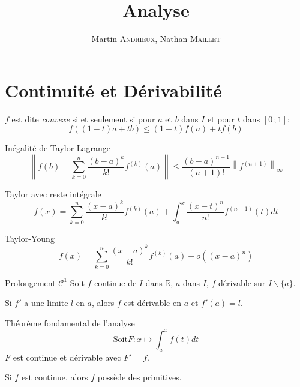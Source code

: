 \documentclass[french, a4paper, 10pt, twocolumn]{article}
\title{Analyse}
\author{Martin \textsc{Andrieux}, Nathan \textsc{Maillet}}
\date{}
\newcommand{\ssi}{si et seulement si\xspace}		%
\newcommand{\R}{\mathbb{R}}   %
\newcommand{\po}{\left(}         %
\newcommand{\pf}{\right)}        %
\newcommand{\pof}[1]{\po #1 \pf} %
\newcommand{\interff}[2]{\left[#1\,;#2\right]}   %
\begin{document}
\maketitle

\section{Continuité et Dérivabilité}
\begin{definition}
  \(f\) est dite \emph{convexe} \ssi pour \(a\) et \(b\) dans \(I\) et pour \(t\) dans \(\interff{0}{1}\):
  \[f((1-t)a+tb)\leqslant (1-t)f(a)+tf(b)\]
\end{definition}

\begin{theoreme}{Inégalité de Taylor-Lagrange}
  \[\left\lVert f(b)-\sum_{k=0}^{n}\dfrac{\pof{b-a}^{k}}{k!}f^{(k)}(a)\right\rVert \leqslant\dfrac{\pof{b-a}^{n+1}}{(n+1)!}\left\lVert f^{(n+1)}\right\rVert_{\infty}\]
\end{theoreme}

\begin{theoreme}{Taylor avec reste intégrale}
\[f(x)=\sum_{k=0}^{n}\dfrac{\pof{x-a}^{k}}{k!}f^{(k)}(a)+\int_{a}^{x}\dfrac{\pof{x-t}^{n}}{n!}f^{(n+1)}(t)dt\]
\end{theoreme}

\begin{theoreme}{Taylor-Young}
\[f(x)=\sum_{k=0}^{n}\dfrac{\pof{x-a}^{k}}{k!}f^{(k)}(a)+o\pof{(x-a)^{n}}\]
\end{theoreme}

\begin{theoreme}{Prolongement \(\mathcal C^{1}\)}
  Soit \(f\) continue de \(I\) dans \(\R\), \(a\) dans \(I\), \(f\) dérivable sur \(I\backslash \lbrace a\rbrace\).

  Si \(f'\) a une limite \(l\) en \(a\), alors \(f\) est dérivable en \(a\) et \(f'(a)=l\).
\end{theoreme}

\begin{theoreme}{Théorème fondamental de l'analyse}
  \[\mathrm{Soit } F : x\mapsto \int_{a}^{x}f(t)dt\]
  \(F\) est continue et dérivable avec \(F'=f\).

  Si \(f\) est continue, alors \(f\) possède des primitives.
\end{theoreme}
\end{document}
